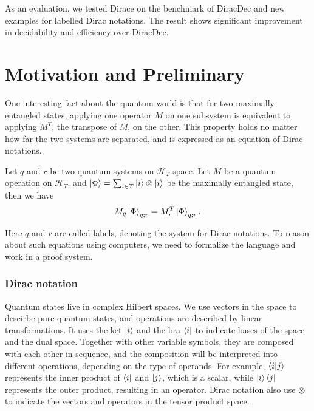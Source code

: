 \documentclass[runningheads]{llncs}
\newcommand{\yx}[1]{\textit{\color{blue}[YX] : #1}}
\begin{document}
As an evaluation, we tested Dirace on the benchmark of DiracDec and new examples for labelled Dirac notations. 
The result shows significant improvement in decidability and efficiency over DiracDec.






\section{Motivation and Preliminary}
One interesting fact about the quantum world is that for two maximally entangled states, applying one operator $M$ on one subsystem is equivalent to applying $M^T$, the transpose of $M$, on the other. This property holds no matter how far the two systems are separated, and is expressed as an equation of Dirac notations.
\begin{example}
    \label{ex: motivating}
    Let $q$ and $r$ be two quantum systems on $\mathcal{H}_T$ space. Let $M$ be a quantum operation on $\mathcal{H}_T$,
    and $\ket{\Phi} = \sum_{i \in T} \ket{i}\otimes \ket{i}$ be the maximally entangled state, then we have
    \[
    M_q \ket{\Phi}_{q; r} = M_r^T \ket{\Phi}_{q; r}.
    \]
\end{example}
Here $q$ and $r$ are called labels, denoting the system for Dirac notations.
To reason about such equations using computers, we need to formalize the language and work in a proof system.

\subsubsection{Dirac notation}
Quantum states live in complex Hilbert spaces. We use vectors in the space to descirbe pure quantum states, and operations are described by linear transformations. 
It uses the ket $\ket{i}$ and the bra $\bra{i}$ to indicate bases of the space and the dual space. Together with other variable symbols, they are composed with each other in sequence, and the composition will be interpreted into different operations, depending on the type of operands. For example, $\braket{i|j}$ represents the inner product of $\bra{i}$ and $\ket{j}$, which is a scalar, while $\ket{i}\bra{j}$ represents the outer product, resulting in an operator. 
Dirac notation also use $\otimes$ to indicate the vectors and operators in the tensor product space.
\end{document}
